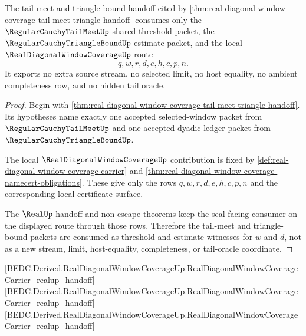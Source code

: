 \begin{theorem}
\label{thm:real-diagonal-window-coverage-tail-meet-triangle-scope}
The tail-meet and triangle-bound handoff cited by \autoref{thm:real-diagonal-window-coverage-tail-meet-triangle-handoff} consumes only the $\RegularCauchyTailMeetUp$ shared-threshold packet, the $\RegularCauchyTriangleBoundUp$ estimate packet, and the local $\RealDiagonalWindowCoverageUp$ route
$$
q,w,r,d,e,h,c,p,n.
$$
It exports no extra source stream, no selected limit, no host equality, no ambient completeness row, and no hidden tail oracle.
\end{theorem}
\begin{proof}
Begin with \autoref{thm:real-diagonal-window-coverage-tail-meet-triangle-handoff}. Its hypotheses name exactly one accepted selected-window packet from $\RegularCauchyTailMeetUp$ and one accepted dyadic-ledger packet from $\RegularCauchyTriangleBoundUp$.

The local $\RealDiagonalWindowCoverageUp$ contribution is fixed by \autoref{def:real-diagonal-window-coverage-carrier} and \autoref{thm:real-diagonal-window-coverage-namecert-obligations}. These give only the rows $q,w,r,d,e,h,c,p,n$ and the corresponding local certificate surface.

The $\RealUp$ handoff and non-escape theorems keep the seal-facing consumer on the displayed route through those rows. Therefore the tail-meet and triangle-bound packets are consumed as threshold and estimate witnesses for $w$ and $d$, not as a new stream, limit, host-equality, completeness, or tail-oracle coordinate.
\end{proof}

[BEDC.Derived.RealDiagonalWindowCoverageUp.RealDiagonalWindowCoverageCarrier\_realup\_handoff]
[BEDC.Derived.RealDiagonalWindowCoverageUp.RealDiagonalWindowCoverageCarrier\_realup\_handoff]
[BEDC.Derived.RealDiagonalWindowCoverageUp.RealDiagonalWindowCoverageCarrier\_realup\_handoff]

